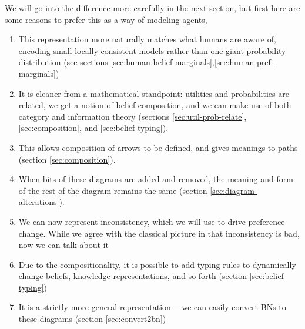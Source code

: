 \documentclass{article}
\begin{document}
	We will go into the difference more carefully in the next section, but first here are some reasons to prefer this as a way of modeling agents,%
	
	\begin{enumerate}[nosep]
		\item This representation more naturally matches what humans are aware of, encoding small locally consistent models rather than one giant probability distribution (see sections \ref{sec:human-belief-marginals},\ref{sec:human-pref-marginals})
		\item It is cleaner from a mathematical standpoint: utilities and probabilities are related, we get a notion of belief composition, and we can make use of both category and information theory (sections \ref{sec:util-prob-relate}, \ref{sec:composition}, and \ref{sec:belief-typing}).
		\item This allows composition of arrows to be defined, and gives meanings to paths (section \ref{sec:composition}).
		\item When bits of these diagrams are added and removed, the meaning and form of the rest of the diagram remains the same (section \ref{sec:diagram-alterations}).
		\item We can now represent inconsistency, which we will use to drive preference change. While we agree with the classical picture in that inconsistency is bad, now we can talk about it
		\item Due to the compositionality, it is possible to add typing rules to dynamically change beliefs, knowledge representations, and so forth (section \ref{sec:belief-typing})
		\item It is a strictly more general representation--- we can easily convert BNs to these diagrams (section \ref{sec:convert2bn})
	\end{enumerate}
\end{document}
